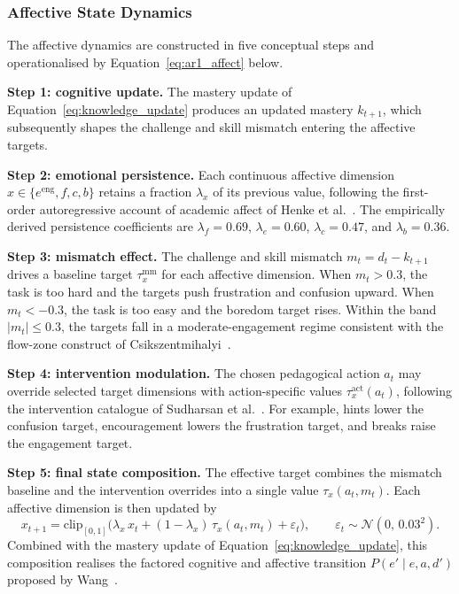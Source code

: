 \subsubsection{Affective State Dynamics}\label{sec:method_emotion_engagement}

The affective dynamics are constructed in five conceptual steps and operationalised by Equation~\eqref{eq:ar1_affect} below.

\textbf{Step 1: cognitive update.} The mastery update of Equation~\eqref{eq:knowledge_update} produces an updated mastery $k_{t+1}$, which subsequently shapes the challenge and skill mismatch entering the affective targets.

\textbf{Step 2: emotional persistence.} Each continuous affective dimension $x \in \{e^\mathrm{eng}, f, c, b\}$ retains a fraction $\lambda_x$ of its previous value, following the first-order autoregressive account of academic affect of Henke et al.~\cite{henke_dsem_2026}. The empirically derived persistence coefficients are $\lambda_f = 0.69$, $\lambda_e = 0.60$, $\lambda_c = 0.47$, and $\lambda_b = 0.36$.

\textbf{Step 3: mismatch effect.} The challenge and skill mismatch $m_t = d_t - k_{t+1}$ drives a baseline target $\tau_x^{\mathrm{mm}}$ for each affective dimension. When $m_t > 0.3$, the task is too hard and the targets push frustration and confusion upward. When $m_t < -0.3$, the task is too easy and the boredom target rises. Within the band $|m_t| \leq 0.3$, the targets fall in a moderate-engagement regime consistent with the flow-zone construct of Csikszentmihalyi~\cite{csikszentmihalyi_flow_1990}.

\textbf{Step 4: intervention modulation.} The chosen pedagogical action $a_t$ may override selected target dimensions with action-specific values $\tau_x^{\mathrm{act}}(a_t)$, following the intervention catalogue of Sudharsan et al.~\cite{sudharsan_intervention_2026}. For example, hints lower the confusion target, encouragement lowers the frustration target, and breaks raise the engagement target.

\textbf{Step 5: final state composition.} The effective target combines the mismatch baseline and the intervention overrides into a single value $\tau_x(a_t, m_t)$. Each affective dimension is then updated by
\begin{equation}
    x_{t+1} = \mathrm{clip}_{[0,1]}\!\bigl( \lambda_x\, x_t + (1 - \lambda_x)\, \tau_x(a_t, m_t) + \varepsilon_t \bigr), \qquad \varepsilon_t \sim \mathcal{N}(0,\, 0.03^2).
    \label{eq:ar1_affect}
\end{equation}
Combined with the mastery update of Equation~\eqref{eq:knowledge_update}, this composition realises the factored cognitive and affective transition $P(e' \mid e, a, d')$ proposed by Wang~\cite{wang_factored_pomdp_2018}.

